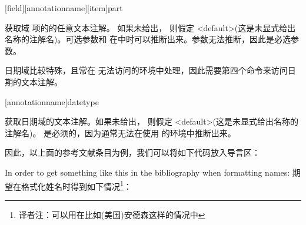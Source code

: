 \begin{ltxsyntax}
[field][annotationname][item]{part}


获取域 项的的任意文本注解。
如果未给出，
则假定 <default>(这是未显式给出名称的注解名)。可选参数和 
在中时可以推断出来。参数无法推断，因此是必选参数。



日期域比较特殊，且常在 无法访问的环境中处理，因此需要第四个命令来访问日期的文本注解。

[annotationname]{datetype}


获取日期域的文本注解。如果未给出，
则假定 <default>(这是未显式给出名称的注解名)。
 是必须的，因为通常无法在使用  的环境中推断出来。

\end{ltxsyntax}
%
因此，以上面的参考文献条目为例，我们可以将如下代码放入导言区：

\begin{ltxexample}[style=latex]
\renewcommand*{\mkbibnamefamily}[1]{%
  #1\space\mkbibparens{\getpartannotation{family}}}
\end{ltxexample}
%
In order to get something like this in the bibliography when formatting names:
期望在格式化姓名时得到如下情况\footnote{译者注：可以用在比如(美国)安德森这样的情况中}：

